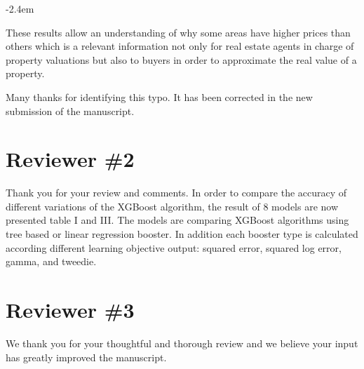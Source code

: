 \documentclass[]{article}
\renewenvironment{quote}{\begin{fquote}\advance\leftmargini -2.4em\begin{oldquote}}{\end{oldquote}\end{fquote}}
\newenvironment{fquote}
  {\def\FrameCommand{
	\fboxsep=0.6em %
	\fcolorbox{black}{white}}%
    \MakeFramed {\advance\hsize-2\width \FrameRestore}
    \begin{minipage}{\linewidth}
  }
  {\end{minipage}\endMakeFramed}
\begin{document}
\begin{quote}
These results allow an understanding of why some areas have higher prices than others which is a relevant information not only for real estate agents in charge of property valuations but also to buyers in order to approximate the real value of a property.
\end{quote}


Many thanks for identifying this typo. It has been corrected in the new submission of the manuscript.

\hypertarget{reviewer-2}{%
\section{Reviewer \#2}\label{reviewer-2}}


Thank you for your review and comments. In order to compare the accuracy of different variations of the XGBoost algorithm, the result of 8 models are now presented table I and III. The models are comparing XGBoost algorithms using tree based or linear regression booster. In addition each booster type is calculated according different learning objective output: squared error, squared log error, gamma, and tweedie.

\hypertarget{reviewer-3}{%
\section{Reviewer \#3}\label{reviewer-3}}


We thank you for your thoughtful and thorough review and we believe your input has greatly improved the manuscript.
\end{document}
